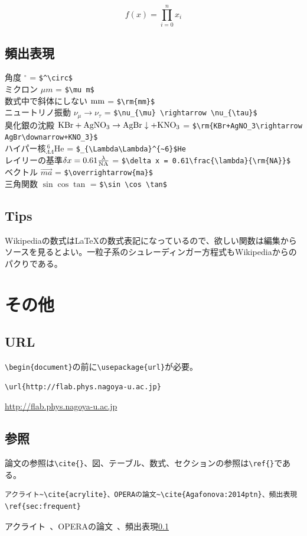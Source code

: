 \documentclass[a4j]{jsarticle}
\begin{document}
\begin{equation}  f(x) = \prod_{i=0}^n x_i \end{equation}
\subsection{頻出表現}
\label{sec:frequent}
\noindent
角度 $^\circ$ = \verb|$^\circ$|\\
ミクロン $\mu m$ = \verb|$\mu m$|\\
数式中で斜体にしない $\rm{mm}$ = \verb|$\rm{mm}$|\\
ニュートリノ振動 $\nu_{\mu} \rightarrow \nu_{\tau}$ = \verb|$\nu_{\mu} \rightarrow \nu_{\tau}$|\\
臭化銀の沈殿 $\rm{KBr+AgNO_3\rightarrow AgBr\downarrow+KNO_3}$ = \verb|$\rm{KBr+AgNO_3\rightarrow AgBr\downarrow+KNO_3}$|\\
ハイパー核$_{\Lambda\Lambda}^{~6}$He = \verb|$_{\Lambda\Lambda}^{~6}$He|\\
レイリーの基準$\delta x = 0.61\frac{\lambda}{\rm{NA}}$ = \verb|$\delta x = 0.61\frac{\lambda}{\rm{NA}}$|\\
ベクトル $\overrightarrow{ma}$ = \verb|$\overrightarrow{ma}$|\\
三角関数 $\sin \cos \tan$ = \verb|$\sin \cos \tan$|

\subsection{Tips}
Wikipediaの数式は\LaTeX  の数式表記になっているので、欲しい関数は編集からソースを見るとよい。一粒子系のシュレーディンガー方程式もWikipediaからのパクりである。
\newpage
\section{その他}
\subsection{URL}
\verb|\begin{document}|の前に\verb|\usepackage{url}|が必要。
\begin{verbatim}
\url{http://flab.phys.nagoya-u.ac.jp}
\end{verbatim}
\url{http://flab.phys.nagoya-u.ac.jp}

\subsection{参照}
論文の参照は\verb|\cite{}|、図、テーブル、数式、セクションの参照は\verb|\ref{}|である。
\begin{verbatim}
アクライト~\cite{acrylite}、OPERAの論文~\cite{Agafonova:2014ptn}、頻出表現\ref{sec:frequent}
\end{verbatim}
アクライト~\cite{acrylite}、OPERAの論文~\cite{Agafonova:2014ptn}、頻出表現\ref{sec:frequent}
\end{document}
